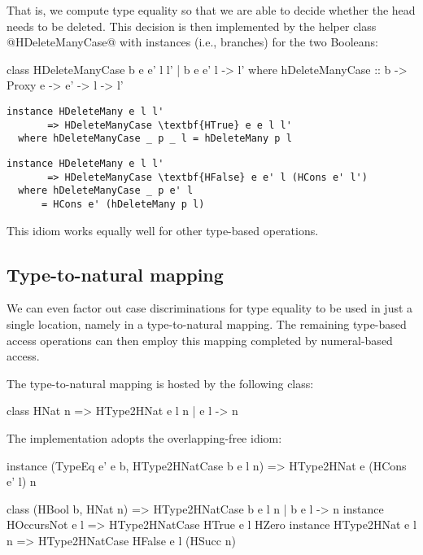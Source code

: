 \documentclass[nocopyrightspace,preprint]{sigplan-proc}
\begin{document}
That is, we compute type equality so that we are able to decide
whether the head needs to be deleted. This decision is then
implemented by the helper class @HDeleteManyCase@ with instances
(i.e., branches) for the two Booleans:

\begin{code}
 class  HDeleteManyCase b e e' l l' | b e e' l -> l'
  where
   hDeleteManyCase :: b -> Proxy e -> e' -> l -> l'
\end{code}

\begin{Verbatim}[commandchars=\\\{\}]
 instance HDeleteMany e l l'
       => HDeleteManyCase \textbf{HTrue} e e l l'
  where hDeleteManyCase _ p _ l = hDeleteMany p l
\end{Verbatim}

\begin{Verbatim}[commandchars=\\\{\}]
 instance HDeleteMany e l l'
       => HDeleteManyCase \textbf{HFalse} e e' l (HCons e' l')
  where hDeleteManyCase _ p e' l
      = HCons e' (hDeleteMany p l)
\end{Verbatim}

This idiom works equally well for other type-based operations.


\medskip

\subsection*{Type-to-natural mapping}

We can even factor out case discriminations for type equality to be
used in just a single location, namely in a type-to-natural
mapping. The remaining type-based access operations can then employ
this mapping completed by numeral-based access.

The type-to-natural mapping is hosted by the following class:

\begin{code}
 class HNat n => HType2HNat e l n | e l -> n
\end{code}

The implementation adopts the overlapping-free idiom:

\begin{code}
 instance (TypeEq e' e b, HType2HNatCase b e l n)
       =>  HType2HNat e (HCons e' l) n
\end{code}

\begin{code}
 class (HBool b, HNat n)
    =>  HType2HNatCase b e l n | b e l -> n
 instance HOccursNot e l
       => HType2HNatCase HTrue e l HZero
 instance HType2HNat e l n
       => HType2HNatCase HFalse e l (HSucc n)
\end{code}
\end{document}
